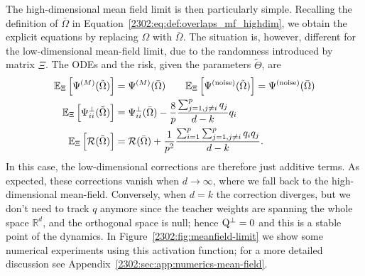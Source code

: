 The high-dimensional mean field limit is then particularly simple. Recalling the definition of \(\bar\Omega\) in Equation~\eqref{2302:eq:def:overlaps_mf_highdim}, we obtain  the explicit equations by replacing \(\Omega\) with \(\bar\Omega\). The situation is, however, different for the low-dimensional mean-field limit, due to the randomness introduced by matrix \(\Xi\). The 
ODEs and the risk, given the parameters $\tilde\Theta$, are
\begin{equation}\label{2302:eq:def:mf_square}\begin{split}
    \mathbb{E}_{\Xi}\left[\Psi^{(M)}(\tilde\Omega)\right] &= \Psi^{(M)}(\bar\Omega) \qquad
    \mathbb{E}_{\Xi}\left[\Psi^{(\mathrm{noise})}(\tilde\Omega)\right] = \Psi^{(\mathrm{noise})}(\bar\Omega) \\
    \mathbb{E}_{\Xi}\left[\Psi^{\bot}_{ii}(\tilde\Omega)\right] &= \Psi^{\bot}_{ii}(\bar\Omega) - \frac8p \frac{\sum_{j=1,j\neq i}^p q_j}{d-k}q_i \\
    \mathbb{E}_{\Xi}\left[\mathcal{R}(\tilde\Omega)\right] &= \mathcal{R}(\bar\Omega) + \frac{1}{p^2} \frac{\sum_{i=1}^p\sum_{j=1,j\neq i}^p q_iq_j}{d-k}.
\end{split}\end{equation}
In this case, the low-dimensional corrections are therefore just additive terms. As expected, these corrections vanish when \(d\to\infty\), where we fall back to the high-dimensional mean-field. Conversely, when \(d= k\) the correction diverges, but we don't need to track \(q\) anymore since the teacher weights are spanning the whole space \(\mathbb{R}^d\), and the orthogonal space is null; hence \(\mathrm{Q}^\bot = 0\) and this is a stable point of the dynamics. In Figure~\ref{2302:fig:meanfield-limit} we show some numerical experiments using this activation function; for a more detailed discussion see Appendix~\ref{2302:sec:app:numerics-mean-field}.
